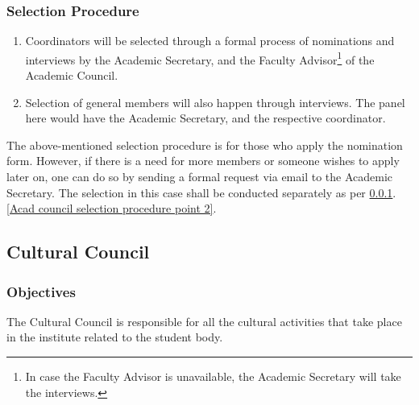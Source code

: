 \documentclass[12pt]{article}
\begin{document}
\subsubsection{Selection Procedure} \label{Acad council selection procedure}
\begin{enumerate}
    \item Coordinators will be selected through a formal process of nominations and interviews by the Academic Secretary, and the Faculty Advisor\footnote{In case the Faculty Advisor is unavailable, the Academic Secretary will take the interviews.} of the Academic Council.
    \item Selection of general members will also happen through interviews. The panel here would have the Academic Secretary, and the respective coordinator. \label{Acad council selection procedure point 2}
\end{enumerate}

\noindent The above-mentioned selection procedure is for those who apply the nomination form. However, if there is a need for more members or someone wishes to apply later on, one can do so by sending a formal request via email to the Academic Secretary. The selection in this case shall be conducted separately as per \ref{Acad council selection procedure}.\ref{Acad council selection procedure point 2}.


\newpage
\subsection{Cultural Council}
\subsubsection{Objectives}
The Cultural Council is responsible for all the cultural activities that take place in the institute related to the student body.
\end{document}
